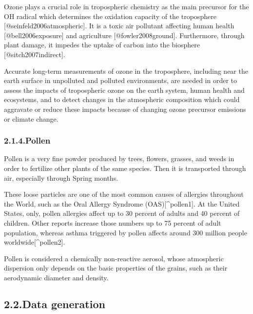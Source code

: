 \documentclass[9pt]{report}
\begin{document}
Ozone plays a crucial role in tropospheric chemistry as the main precursor for the OH radical which determines the oxidation capacity of the troposphere [@seinfeld2006atmospheric].
It is a toxic air pollutant affecting human health [@bell2006exposure] and agriculture [@fowler2008ground].
Furthermore, through plant damage, it impedes the uptake of carbon into the biosphere [@sitch2007indirect].%

Accurate long-term measurements of ozone in the troposphere, including near the earth surface in unpolluted and polluted environments, are needed in order to assess the impacts of tropospheric ozone on the earth system, human health and ecosystems, and to detect changes in the atmospheric composition which could aggravate or reduce these impacts because of changing ozone precursor emissions or climate change.%

\subsubsection{2.1.4.\hspace*{0.5em}Pollen}\label{sec-pollen}%

\noindent{}Pollen is a very fine powder produced by trees, flowers, grasses, and weeds in order to fertilize other plants of the same species.
Then it is transported through air, especially through Spring months.%

These loose particles are one of the most common causes of allergies throughout the World, such as the Oral Allergy Syndrome (OAS)[\textasciicircum{}pollen1].
At the United States, only, pollen allergies affect up to 30 percent of adults and 40 percent of children.
Other reports increase those numbers up to 75 percent of adult population, whereas asthma triggered by pollen affects around 300 million people worldwide[\textasciicircum{}pollen2].%

Pollen is considered a chemically non-reactive aerosol, whose atmospheric dispersion only depends on the basic properties of the grains, such as their aerodynamic diameter and density.%

\subsection{2.2.\hspace*{0.5em}Data generation}\label{sec-data-generation}%
\end{document}
